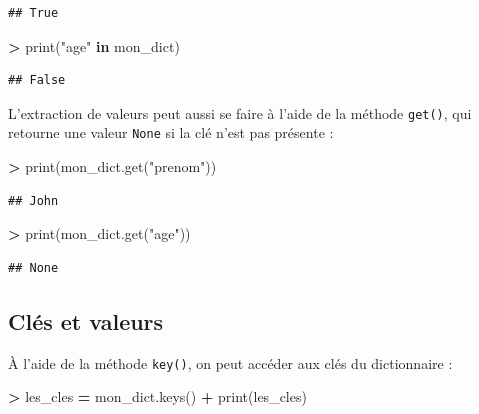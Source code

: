 \documentclass[12pt,]{book}
\newenvironment{Shaded}{\begin{snugshade}}{\end{snugshade}}
\newcommand{\KeywordTok}[1]{\textcolor[rgb]{0.13,0.29,0.53}{\textbf{#1}}}
\newcommand{\StringTok}[1]{\textcolor[rgb]{0.31,0.60,0.02}{#1}}
\newcommand{\OperatorTok}[1]{\textcolor[rgb]{0.81,0.36,0.00}{\textbf{#1}}}
\newcommand{\BuiltInTok}[1]{#1}
\newcommand{\NormalTok}[1]{#1}
\numberwithin{equation}{section}
\numberwithin{countremarque}{section}
\begin{document}
\begin{lstlisting}
## True
\end{lstlisting}

\begin{Shaded}
\begin{Highlighting}[]
\OperatorTok{>} \BuiltInTok{print}\NormalTok{(}\StringTok{"age"} \KeywordTok{in}\NormalTok{ mon_dict)}
\end{Highlighting}
\end{Shaded}

\begin{lstlisting}
## False
\end{lstlisting}

L'extraction de valeurs peut aussi se faire à l'aide de la méthode
\texttt{get()}, qui retourne une valeur \texttt{None} si la clé n'est
pas présente :

\begin{Shaded}
\begin{Highlighting}[]
\OperatorTok{>} \BuiltInTok{print}\NormalTok{(mon_dict.get(}\StringTok{"prenom"}\NormalTok{))}
\end{Highlighting}
\end{Shaded}

\begin{lstlisting}
## John
\end{lstlisting}

\begin{Shaded}
\begin{Highlighting}[]
\OperatorTok{>} \BuiltInTok{print}\NormalTok{(mon_dict.get(}\StringTok{"age"}\NormalTok{))}
\end{Highlighting}
\end{Shaded}

\begin{lstlisting}
## None
\end{lstlisting}

\subsection{Clés et valeurs}\label{cles-et-valeurs}

À l'aide de la méthode \texttt{key()}, on peut accéder aux clés du
dictionnaire :

\begin{Shaded}
\begin{Highlighting}[]
\OperatorTok{>}\NormalTok{ les_cles }\OperatorTok{=}\NormalTok{ mon_dict.keys()}
\OperatorTok{+} \BuiltInTok{print}\NormalTok{(les_cles)}
\end{Highlighting}
\end{Shaded}
\end{document}
